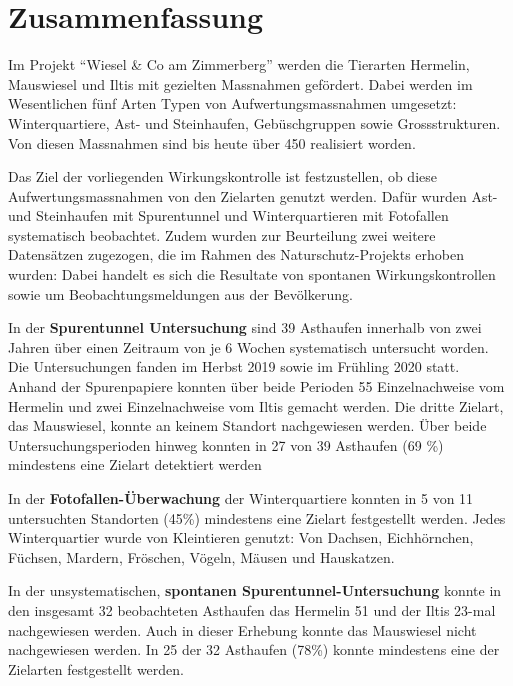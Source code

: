 \documentclass[
  oneside]{scrbook}
\let\oldmaketitle\maketitle
\begin{document}
\let\maketitle\oldmaketitle



{
\setcounter{tocdepth}{1}
\tableofcontents
}
\hypertarget{zusammenfassung}{%
\chapter*{Zusammenfassung}\label{zusammenfassung}}

Im Projekt ``Wiesel \& Co am Zimmerberg'' werden die Tierarten Hermelin, Mauswiesel und Iltis mit gezielten Massnahmen gefördert. Dabei werden im Wesentlichen fünf Arten Typen von Aufwertungsmassnahmen umgesetzt: Winterquartiere, Ast- und Steinhaufen, Gebüschgruppen sowie Grossstrukturen. Von diesen Massnahmen sind bis heute über 450 realisiert worden.

Das Ziel der vorliegenden Wirkungskontrolle ist festzustellen, ob diese Aufwertungsmassnahmen von den Zielarten genutzt werden. Dafür wurden Ast- und Steinhaufen mit Spurentunnel und Winterquartieren mit Fotofallen systematisch beobachtet. Zudem wurden zur Beurteilung zwei weitere Datensätzen zugezogen, die im Rahmen des Naturschutz-Projekts erhoben wurden: Dabei handelt es sich die Resultate von spontanen Wirkungskontrollen sowie um Beobachtungsmeldungen aus der Bevölkerung.

In der \textbf{Spurentunnel Untersuchung} sind 39 Asthaufen innerhalb von zwei Jahren über einen Zeitraum von je 6 Wochen systematisch untersucht worden. Die Untersuchungen fanden im Herbst 2019 sowie im Frühling 2020 statt. Anhand der Spurenpapiere konnten über beide Perioden 55 Einzelnachweise vom Hermelin und zwei Einzelnachweise vom Iltis gemacht werden. Die dritte Zielart, das Mauswiesel, konnte an keinem Standort nachgewiesen werden. Über beide Untersuchungsperioden hinweg konnten in 27 von 39 Asthaufen (69 \%) mindestens eine Zielart detektiert werden

In der \textbf{Fotofallen-Überwachung} der Winterquartiere konnten in 5 von 11 untersuchten Standorten (45\%) mindestens eine Zielart festgestellt werden. Jedes Winterquartier wurde von Kleintieren genutzt: Von Dachsen, Eichhörnchen, Füchsen, Mardern, Fröschen, Vögeln, Mäusen und Hauskatzen.

In der unsystematischen, \textbf{spontanen Spurentunnel-Untersuchung} konnte in den insgesamt 32 beobachteten Asthaufen das Hermelin 51 und der Iltis 23-mal nachgewiesen werden. Auch in dieser Erhebung konnte das Mauswiesel nicht nachgewiesen werden. In 25 der 32 Asthaufen (78\%) konnte mindestens eine der Zielarten festgestellt werden.
\end{document}
